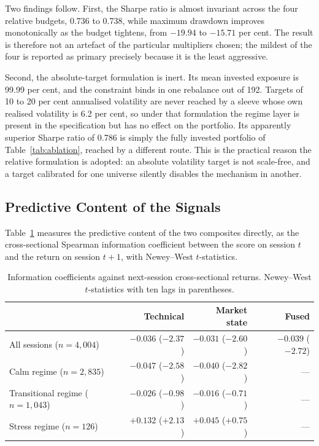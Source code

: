 Two findings follow. First, the Sharpe ratio is almost invariant across the four
relative budgets, 0.736 to 0.738, while maximum drawdown improves monotonically as the
budget tightens, from $-19.94$ to $-15.71$ per cent. The result is therefore not an
artefact of the particular multipliers chosen; the mildest of the four is reported as
primary precisely because it is the least aggressive.

Second, the absolute-target formulation is inert. Its mean invested exposure is 99.99
per cent, and the constraint binds in one rebalance out of 192. Targets of 10 to 20 per
cent annualised volatility are never reached by a sleeve whose own realised volatility
is 6.2 per cent, so under that formulation the regime layer is present in the
specification but has no effect on the portfolio. Its apparently superior Sharpe ratio
of 0.786 is simply the fully invested portfolio of Table~\ref{tab:ablation}, reached by a different
route. This is the practical reason the relative formulation is adopted: an absolute
volatility target is not scale-free, and a target calibrated for one universe silently
disables the mechanism in another.

\subsection{Predictive Content of the Signals}
\label{sec:ic}

Table~\ref{tab:ic} measures the predictive content of the two composites directly, as the
cross-sectional Spearman information coefficient between the score on session $t$ and
the return on session $t+1$, with Newey--West $t$-statistics.

\begin{table}[!ht]
\centering
\caption{Information coefficients against next-session cross-sectional returns.
Newey--West $t$-statistics with ten lags in parentheses.}
\label{tab:ic}
\small
\begin{tabular}{p{3.8cm}rrr}
\hline
& \textbf{Technical} & \textbf{Market state} & \textbf{Fused} \\
\hline
All sessions ($n=4{,}004$) & $-0.036$ ($-2.37$) & $-0.031$ ($-2.60$) & $-0.039$ ($-2.72$) \\
Calm regime ($n=2{,}835$) & $-0.047$ ($-2.58$) & $-0.040$ ($-2.82$) & --- \\
Transitional regime ($n=1{,}043$) & $-0.026$ ($-0.98$) & $-0.016$ ($-0.71$) & --- \\
Stress regime ($n=126$) & $+0.132$ ($+2.13$) & $+0.045$ ($+0.75$) & --- \\
\hline
\end{tabular}
\end{table}

